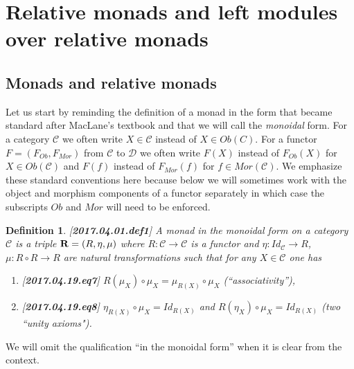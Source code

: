 \documentclass[12pt]{amsart}
\newtheorem{definition}[proposition]{Definition}
\newcommand{\llabel}[1]{\label{#1}[{\bf #1}]}
\newcommand{\sr}{\rightarrow}
\newcommand{\wh}{\widehat}
\newcommand{\R}{{\bf R}}
\newcommand{\C}{{\mathcal C}}
\newcommand{\D}{{\mathcal D}}
\begin{document}


\section{Relative monads and left modules over relative monads}

\subsection{Monads and relative monads} 

Let us start by reminding the definition of a monad in the form that became standard after MacLane's textbook \cite[p.133]{MacLane} and that we will call the {\em monoidal} form. For a category $\C$ we often write $X\in\C$ instead of $X\in Ob(C)$. For a functor $F=(F_{Ob},F_{Mor})$ from $\C$ to $\D$ we often write $F(X)$ instead of $F_{Ob}(X)$ for $X\in Ob(\C)$ and $F(f)$ instead of $F_{Mor}(f)$ for $f\in Mor(\C)$.  We emphasize these standard conventions here because below we will sometimes work with the object and morphism components of a functor separately in which case the subscripts $Ob$ and $Mor$ will need to be enforced.  
%
\begin{definition}
\llabel{2017.04.01.def1}
A monad in the monoidal form on a category $\C$ is a triple $\R=(R,\eta,\mu)$ where $R:\C\sr \C$ is a functor and  $\eta:Id_{\C}\sr R$, $\mu:R\circ R\sr R$ are natural transformations such that for any $X\in\C$ one has
%
\begin{enumerate}
\item \llabel{2017.04.19.eq7} $R(\mu_X)\circ \mu_{X}=\mu_{R(X)}\circ \mu_X$ (``associativity''),
\item \llabel{2017.04.19.eq8} $\eta_{R(X)}\circ \mu_X=Id_{R(X)}$ and $R(\eta_X)\circ \mu_X=Id_{R(X)}$ (two ``unity axioms").
\end{enumerate}
\end{definition}
%
We will omit the qualification ``in the monoidal form'' when it is clear from the context. 
\end{document}

